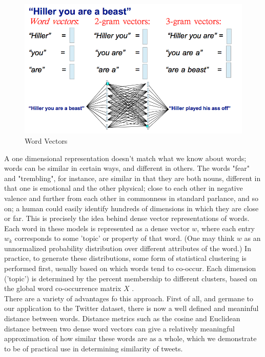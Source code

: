 \documentclass[conference]{IEEEtran}
\begin{document}
\begin{figure}
	\centering
	\includegraphics[scale=0.4]{tweet_cmp_cs221.png}
	\caption{Word Vectors}
	\label{fig1}
\end{figure}

\indent A one dimensional representation doesn't match what we know about words; words can be similar in certain ways, and different in others.  The words "fear" and "trembling", for instance, are similar in that they are both nouns, different in that one is emotional and the other physical; close to each other in negative valence and further from each other in commonness in standard parlance, and so on; a human could easily identify hundreds of dimensions in which they are close or far.  This is precisely the idea behind dense vector representations of words. Each word in these models is represented as a dense vector $w$, where each entry $w_k$ corresponds to some 'topic' or property of that word. (One may think $w$ as an unnormalized probability distribution over different attributes of the word.) In practice, to generate these distributions, some form of statistical clustering is performed first, usually based on which words tend to co-occur. Each dimension ('topic') is determined by the percent membership to different clusters, based on the global word co-occurrence matrix $X$ \cite{Wordvec}.\\


There are a variety of advantages fo this approach.  First of all, and germane to our application to the Twitter dataset, there is now a well defined and meaninful distance between words.  Distance metrics such as the cosine and Euclidean distance between two dense word vectors can give a relatively meaningful approximation of how similar these words are as a whole, which we demonstrate to be of practical use in determining similarity of tweets.\\
\end{document}
